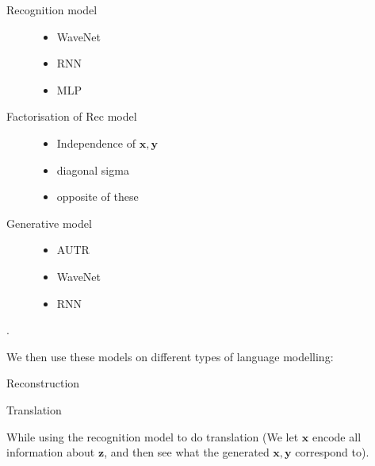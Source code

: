 \begin{description}
\item[Recognition model]
  \begin{itemize}
  \item WaveNet
  \item RNN
  \item MLP
  \end{itemize}
\item[Factorisation of Rec model]
  \begin{itemize}
  \item Independence of $\bm{x}, \bm{y}$
  \item diagonal sigma
  \item opposite of these
  \end{itemize}
\item[Generative model]
  \begin{itemize}
  \item AUTR
  \item WaveNet
  \item RNN
  \end{itemize}
\end{description}.

We then use these models on different types of language modelling:

\begin{description}
\item[Reconstruction]
  \begin{figure}[h]
    \center
  \end{figure}
\item[Translation]
  \begin{figure}[h]
    \center
  \end{figure}
\end{description}
While using the recognition model to do translation (We let $\bm{x}$ encode all
information about $\bm{z}$, and then see what the generated $\bm{x}, \bm{y}$
correspond to).
